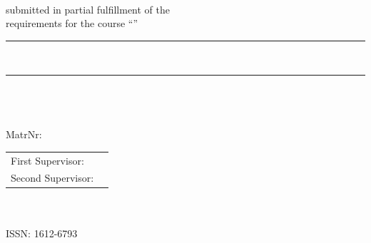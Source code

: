 
\begin{titlepage}
	
\begin{center}
	
	\vspace*{.06\textheight}
	{\LARGE \textbf{\thesistype}\\}
	submitted in partial fulfillment of the\\
	requirements for the course ``\course''\\[0.5cm]
	
	
	\rule{.9\linewidth}{.6pt} \\[0.4cm] %
	{\huge \bfseries \thesistitle}\vspace{0.4cm}
	\rule{.9\linewidth}{.6pt} \\[1.5cm] %
	
	\Large\authorname\\
	\hfill\\
	\large MatrNr: \matrikelnumber\\ \vfill
	\begin{tabular}{@{}ll}
		First Supervisor: &\firstsupervisor\\
		Second Supervisor: &\secondsupervisor
	\end{tabular}
	\vfill
	\university\\
	\department\\
	ISSN: 1612-6793
	\vfill
	{\large \submissiondate}\\[4cm] %
	
	\vfill
\end{center}

\newpage
\vfill




\end{titlepage}